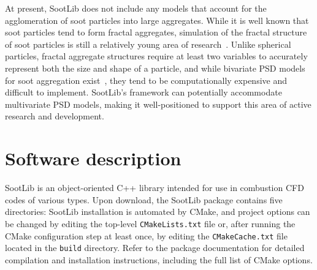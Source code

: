 \documentclass[preprint,letterpaper]{elsarticle}
\begin{document}
At present, SootLib does not include any models that account for the agglomeration of soot particles into large aggregates. While it is well known that soot particles tend to form fractal aggregates, simulation of the fractal structure of soot particles is still a relatively young area of research~\cite{Patterson_2007}. Unlike spherical particles, fractal aggregate structures require at least two variables to accurately represent both the size and shape of a particle, and while bivariate PSD models for soot aggregation exist~\cite{Wright_2001,Mueller_2009,Blanquart_2009c}, they tend to be computationally expensive and difficult to implement. SootLib's framework can potentially accommodate multivariate PSD models, making it well-positioned to support this area of active research and development.


\section{Software description}
\label{s:architecture}

SootLib is an object-oriented C++ library intended for use in combustion CFD codes of various types.
Upon download, the SootLib package contains five directories:
SootLib installation is automated by CMake, and project options can be changed by editing the top-level \texttt{CMakeLists.txt} file or, after running the CMake configuration step at least once, by editing the \texttt{CMakeCache.txt} file located in the \texttt{build} directory. Refer to the package documentation for detailed compilation and installation instructions, including the full list of CMake options.
\end{document}
